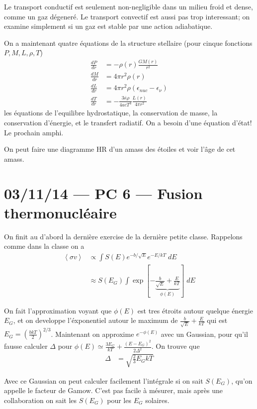 \documentclass[10pt]{report}
\newcommand{\rd}[2]{\frac{d#1}{d#2}}
\newcommand{\expvalue}[1]{\left<#1\right>}
\begin{document}
Le transport conductif est seulement non-negligible dans un milieu froid et dense, comme un gaz d\'egener\'e. Le transport convectif est aussi pas trop interessant; on examine simplement si un gaz est stable par une action adiabatique.

On a maintenant quatre \'equations de la structure stellaire (pour cinque fonctions $P,M,L,\rho,T$)
\begin{align}
    \rd{P}{r} &= -\rho(r)\frac{GM(r)}{r^2}\\
    \rd{M}{r} &= 4\pi r^2 \rho(r)\\
    \rd{L}{r} &= 4\pi r^2 \rho(\epsilon_{nuc} - \epsilon_\nu)\\
    \rd{T}{r} &= -\frac{3\overline{\kappa}\rho}{4acT^3}\frac{L(r)}{4\pi r^2}
\end{align}
les \'equations de l'equilibre hydrostatique, la conservation de masse, la conservation d'\'energie, et le transfert radiatif. On a besoin d'une \'equation d'\'etat! Le prochain amphi. 

On peut faire une diagramme HR d'un amass des \'etoiles et voir l'\^age de cet amass. 

\chapter{03/11/14 --- PC 6 --- Fusion thermonucl\'eaire}

On finit au d'abord la derni\`ere exercise de la derni\`ere petite classe. Rappelons comme dans la classe on a
\begin{align}
    \expvalue{\sigma v} &\propto \int S(E) e^{-b/\sqrt{E}} e^{-E/kT}\;dE\\
    &\approx S(E_G) \int \exp\left[-\underbrace{\frac{b}{\sqrt{E}} + \frac{E}{kT}}_{\phi(E)}\right]\;dE
\end{align}

On fait l'approximation voyant que $\phi(E)$ est tres \'etroits autour quelque \'energie $E_G$, et on developpe l'\'exponentiel autour le maximum de $\frac{b}{\sqrt{E}} + \frac{E}{kT}$ qui est $E_G = \left(\frac{bkT}{2}\right)^{2/3}$. Maintenant on approxime $e^{-\phi(E)}$ avec un Gaussian, pour qu'il fausse calculer $\Delta$ pour $\phi(E) \simeq \frac{3E_G}{kT} + \frac{(E - E_G)^2}{2\Delta^2}$. On trouve que
\begin{align}
    \Delta &= \sqrt{\frac{2}{3}E_G kT}
\end{align}

Avec ce Gaussian on peut calculer facilement l'int\'egrale si on sait $S(E_G)$, qu'on appelle le facteur de Gamow. C'est pas facile \`a m\'esurer, mais apr\`es une collaboration on sait les $S(E_G)$ pour les $E_G$ solaires.
\end{document}
